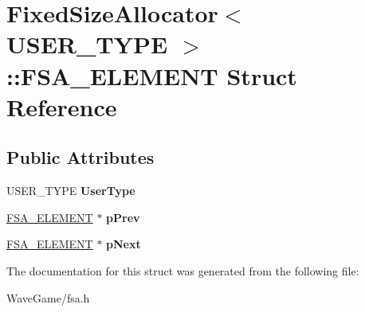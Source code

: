 \hypertarget{struct_fixed_size_allocator_1_1_f_s_a___e_l_e_m_e_n_t}{}\section{Fixed\+Size\+Allocator$<$ U\+S\+E\+R\+\_\+\+T\+Y\+PE $>$\+:\+:F\+S\+A\+\_\+\+E\+L\+E\+M\+E\+NT Struct Reference}
\label{struct_fixed_size_allocator_1_1_f_s_a___e_l_e_m_e_n_t}
\subsection*{Public Attributes}
\begin{DoxyCompactItemize}
\item 
\mbox{\label{struct_fixed_size_allocator_1_1_f_s_a___e_l_e_m_e_n_t_ab03c9e3fd88ea983170e40dd23a70473}} 
U\+S\+E\+R\+\_\+\+T\+Y\+PE {\bfseries User\+Type}
\item 
\mbox{\label{struct_fixed_size_allocator_1_1_f_s_a___e_l_e_m_e_n_t_a2392c4eaf0fe0f15451076d9fc9348ea}} 
\hyperlink{struct_fixed_size_allocator_1_1_f_s_a___e_l_e_m_e_n_t}{F\+S\+A\+\_\+\+E\+L\+E\+M\+E\+NT} $\ast$ {\bfseries p\+Prev}
\item 
\mbox{\label{struct_fixed_size_allocator_1_1_f_s_a___e_l_e_m_e_n_t_a286ad3e87228466107eef29e6e5a7d81}} 
\hyperlink{struct_fixed_size_allocator_1_1_f_s_a___e_l_e_m_e_n_t}{F\+S\+A\+\_\+\+E\+L\+E\+M\+E\+NT} $\ast$ {\bfseries p\+Next}
\end{DoxyCompactItemize}


The documentation for this struct was generated from the following file\+:\begin{DoxyCompactItemize}
\item 
Wave\+Game/fsa.\+h\end{DoxyCompactItemize}
